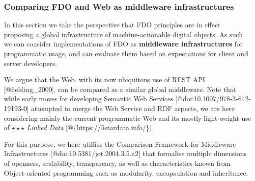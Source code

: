 \hypertarget{sec:middleware}{%
\subsubsection{Comparing FDO and Web as middleware
infrastructures}\label{sec:middleware}}

In this section we take the perspective that FDO principles are in
effect proposing a global infrastructure of machine-actionable digital
objects. As such we can consider implementations of FDO as
\textbf{middleware infrastructures} for programmatic usage, and can
evaluate them based on expectations for client and server developers.

We argue that the Web, with its now ubiquitous use of REST API
{[}@fielding\_2000{]}, can be compared as a similar global middleware.
Note that while early moves for developing Semantic Web Services
{[}@doi:10.1007/978-3-642-19193-0{]} attempted to merge the Web Service
and RDF aspects, we are here considering mainly the current programmatic
Web and its mostly light-weight use of \emph{$\star\star\star$ Linked Data}
{[}@\{https://5stardata.info/\}{]}.

For this purpose, we here utillise the Comparison Framework for
Middleware Infrastructures {[}@doi:10.5381/jot.2004.3.5.a2{]} that
formalise multiple dimensions of openness, scalability, transparency, as
well as characteristics known from Object-oriented programming such as
modularity, encapsulation and inheritance.

